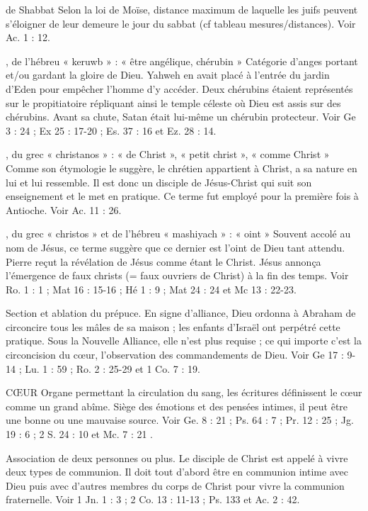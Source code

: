 \begin{multicols}{2}
de Shabbat
Selon la loi de Moïse, distance maximum de laquelle les juifs peuvent s'éloigner de leur demeure le jour du sabbat (cf tableau mesures/distances). Voir Ac. 1 : 12.

, de l'hébreu « keruwb » : « être angélique, chérubin »	
Catégorie d’anges portant et/ou gardant la gloire de Dieu. Yahweh en avait placé à l’entrée du jardin d'Eden pour empêcher l'homme d'y accéder. Deux chérubins étaient représentés sur le propitiatoire répliquant ainsi le temple céleste où Dieu est assis sur des chérubins. Avant sa chute, Satan était lui-même un chérubin protecteur. Voir Ge 3 : 24 ; Ex 25 : 17-20 ; Es. 37 : 16 et Ez. 28 : 14.

, du grec « christanos » : « de Christ », « petit christ », « comme Christ »
Comme son étymologie le suggère, le chrétien appartient à Christ, a sa nature en lui et lui ressemble. Il est donc un disciple de Jésus-Christ qui suit son enseignement et le met en pratique. Ce terme fut employé pour la première fois à Antioche. Voir Ac. 11 : 26.

, du grec « christos » et de l'hébreu « mashiyach » : « oint »
Souvent accolé au nom de Jésus, ce terme suggère que ce dernier est l'oint de Dieu tant attendu. Pierre reçut la révélation de Jésus comme étant le Christ. Jésus annonça l’émergence de faux christs (= faux ouvriers de Christ) à la fin des temps. Voir Ro. 1 : 1 ; Mat 16 : 15-16 ; Hé 1 : 9 ; Mat 24 : 24 et Mc 13 : 22-23.

Section et ablation du prépuce. En signe d'alliance, Dieu ordonna à Abraham de circoncire tous les mâles de sa maison ; les enfants d’Israël ont perpétré cette pratique. Sous la Nouvelle Alliance, elle n’est plus requise ; ce qui importe c’est la circoncision du cœur, l’observation des commandements de Dieu. Voir Ge 17 : 9-14 ; Lu. 1 : 59 ; Ro. 2 : 25-29 et 1 Co. 7 : 19.

CŒUR
Organe permettant la circulation du sang, les écritures définissent le cœur comme un grand abîme. Siège des émotions et des pensées intimes, il peut être une bonne ou une mauvaise source. Voir Ge. 8 : 21 ; Ps. 64 : 7 ; Pr. 12 : 25 ; Jg. 19 : 6 ; 2 S. 24 : 10 et Mc. 7 : 21 .

Association de deux personnes ou plus. Le disciple de Christ est appelé à vivre deux types de communion. Il doit tout d’abord être en communion intime avec Dieu puis avec d’autres membres du corps de Christ pour vivre la communion fraternelle. Voir 1 Jn. 1 : 3 ; 2 Co. 13 : 11-13 ; Ps. 133 et Ac. 2 : 42.


\end{multicols}
